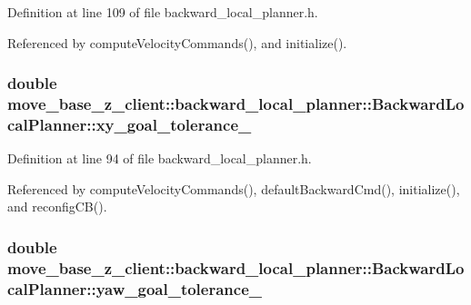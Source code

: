Definition at line 109 of file backward\+\_\+local\+\_\+planner.\+h.



Referenced by compute\+Velocity\+Commands(), and initialize().

\subsubsection[{\texorpdfstring{xy\+\_\+goal\+\_\+tolerance\+\_\+}{xy_goal_tolerance_}}]{\setlength{\rightskip}{0pt plus 5cm}double move\+\_\+base\+\_\+z\+\_\+client\+::backward\+\_\+local\+\_\+planner\+::\+Backward\+Local\+Planner\+::xy\+\_\+goal\+\_\+tolerance\+\_\+\hspace{0.3cm}{\ttfamily [private]}}\hypertarget{classmove__base__z__client_1_1backward__local__planner_1_1BackwardLocalPlanner_a89ab1ee7283a474dc19970789f51c087}{}\label{classmove__base__z__client_1_1backward__local__planner_1_1BackwardLocalPlanner_a89ab1ee7283a474dc19970789f51c087}


Definition at line 94 of file backward\+\_\+local\+\_\+planner.\+h.



Referenced by compute\+Velocity\+Commands(), default\+Backward\+Cmd(), initialize(), and reconfig\+C\+B().

\subsubsection[{\texorpdfstring{yaw\+\_\+goal\+\_\+tolerance\+\_\+}{yaw_goal_tolerance_}}]{\setlength{\rightskip}{0pt plus 5cm}double move\+\_\+base\+\_\+z\+\_\+client\+::backward\+\_\+local\+\_\+planner\+::\+Backward\+Local\+Planner\+::yaw\+\_\+goal\+\_\+tolerance\+\_\+\hspace{0.3cm}{\ttfamily [private]}}\hypertarget{classmove__base__z__client_1_1backward__local__planner_1_1BackwardLocalPlanner_a10d15842054d518159baa535afe6f1fd}{}\label{classmove__base__z__client_1_1backward__local__planner_1_1BackwardLocalPlanner_a10d15842054d518159baa535afe6f1fd}


